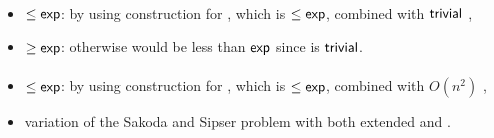 \paragraph{\OLA{}\tto\TNFA}
\begin{itemize}
	\item $\le\mathsf{exp}$: by using construction for \hyperref[cost:1LAto1NFAu]{\OLA{}\tto\ONFA}, which is $\le\mathsf{exp}$, combined with $\mathsf{trivial}$ \ONFA{}\tto\TNFA,
	\item $\ge\mathsf{exp}$: otherwise \hyperref[cost:1DLAto2NFAu]{\ODLA{}\tto\TNFA} would be less than $\mathsf{exp}$ since \ODLA{}\tto\OLA is $\mathsf{trivial}$.
\end{itemize}
\paragraph{\OLA{}\tto\ODLA}
\begin{itemize}
	\item $\le\mathsf{exp}$: by using construction for \hyperref[cost:1LAto1NFAu]{\OLA{}\tto\ONFA}, which is $\le\mathsf{exp}$, combined with $O(n^2)$ \hyperref[cost:1NFAto1DLAu]{\ONFA{}\tto\ODLA},
	\item variation of the Sakoda and Sipser problem with both extended \TNFA and \TDFA.
\end{itemize}


